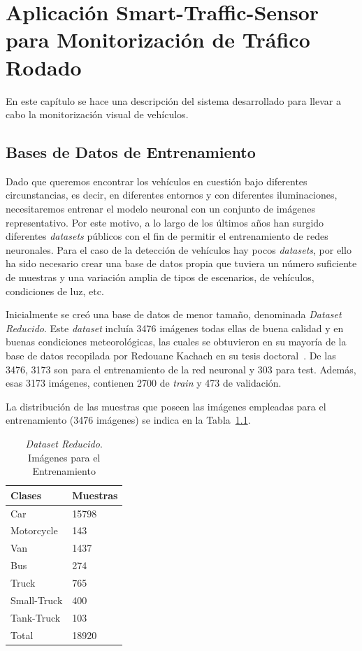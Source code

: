 \chapter{Aplicación Smart-Traffic-Sensor para Monitorización de Tráfico Rodado}\label{cap.diseno}

En este capítulo se hace una descripción del sistema desarrollado para llevar a cabo la monitorización visual de vehículos.

\section{Bases de Datos de Entrenamiento}

Dado que queremos encontrar los vehículos en cuestión bajo diferentes circunstancias, es decir, en diferentes entornos y con diferentes iluminaciones, necesitaremos entrenar el modelo neuronal con un conjunto de imágenes representativo. Por este motivo, a lo largo de los últimos años han surgido diferentes \textit{datasets} públicos con el fin de permitir el entrenamiento de redes neuronales. Para el caso de la detección de vehículos hay pocos \textit{datasets}, por ello ha sido necesario crear una base de datos propia que tuviera un número suficiente de muestras y una variación amplia de tipos de escenarios, de vehículos, condiciones de luz, etc.

Inicialmente se creó una base de datos de menor tamaño, denominada \textit{Dataset Reducido}. Este \textit{dataset} incluía 3476 imágenes todas ellas de buena calidad y en buenas condiciones meteorológicas, las cuales se obtuvieron en su mayoría de la base de datos recopilada por Redouane Kachach en su tesis doctoral~\cite{traffic_monitor_lab}. De las 3476, 3173 son para el entrenamiento de la red neuronal y 303 para test. Además, esas 3173 imágenes, contienen 2700 de \textit{train} y 473 de validación.

La distribución de las muestras que poseen las imágenes empleadas para el entrenamiento (3476 imágenes) se indica en la Tabla~\ref{tabla_database}.

\begin{table}[H]
\begin{center}
\begin{tabular}{|l|l|}
\hline
Clases & Muestras \\
\hline \hline
Car & 15798 \\ \hline
Motorcycle & 143 \\ \hline
Van & 1437 \\ \hline
Bus & 274 \\ \hline
Truck & 765 \\ \hline
Small-Truck & 400 \\ \hline
Tank-Truck & 103 \\ \hline
Total & 18920 \\ \hline
\end{tabular}
\caption{\textit{Dataset Reducido}. Imágenes para el Entrenamiento}
\label{tabla_database}
\end{center}
\end{table}

